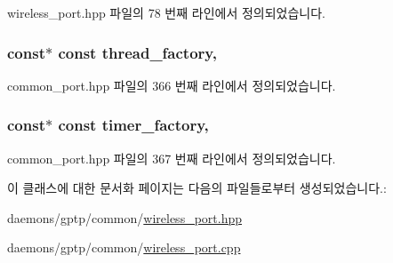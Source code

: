 wireless\+\_\+port.\+hpp 파일의 78 번째 라인에서 정의되었습니다.

\subsubsection[{\texorpdfstring{thread\+\_\+factory}{thread_factory}}]{ const$\ast$ const thread\+\_\+factory\hspace{0.3cm}{\ttfamily [protected]}, {\ttfamily [inherited]}}\hypertarget{class_common_port_a2268fc1f22a57c22f52a6cd1a2d2c609}{}\label{class_common_port_a2268fc1f22a57c22f52a6cd1a2d2c609}


common\+\_\+port.\+hpp 파일의 366 번째 라인에서 정의되었습니다.

\subsubsection[{\texorpdfstring{timer\+\_\+factory}{timer_factory}}]{ const$\ast$ const timer\+\_\+factory\hspace{0.3cm}{\ttfamily [protected]}, {\ttfamily [inherited]}}\hypertarget{class_common_port_a0603401af06940a9018688e0030e68e5}{}\label{class_common_port_a0603401af06940a9018688e0030e68e5}


common\+\_\+port.\+hpp 파일의 367 번째 라인에서 정의되었습니다.



이 클래스에 대한 문서화 페이지는 다음의 파일들로부터 생성되었습니다.\+:\begin{DoxyCompactItemize}
\item 
daemons/gptp/common/\hyperlink{wireless__port_8hpp}{wireless\+\_\+port.\+hpp}\item 
daemons/gptp/common/\hyperlink{wireless__port_8cpp}{wireless\+\_\+port.\+cpp}\end{DoxyCompactItemize}
